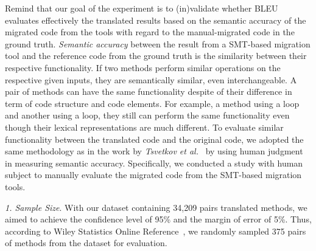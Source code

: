 %
Remind that our goal of the experiment is to (in)validate whether BLEU
evaluates effectively the translated results based on the semantic accuracy 
of the migrated code from the tools with regard to the manual-migrated code 
in the ground truth. 
%
{\em Semantic accuracy} between the result from a SMT-based migration
tool and the reference code from the ground truth is the similarity
between their respective functionality. 
%
If two methods perform similar operations on the respective given
inputs, they are semantically similar, even interchangeable. A pair of
methods can have the same functionality despite of their difference in
term of code structure and code elements.
%
For example, a method using a  loop and another using a
 loop, they still can perform the same functionality even
though their lexical representations are much different. 
%
%
To evaluate similar functionality between the translated code and the
original code, we adopted the same methodology as in the work by {\em
  Tsvetkov et al.}~\cite{tsvetkov-acl15} by using human judgment in
measuring semantic accuracy.
%
%
Specifically, we conducted a study with human subject to manually
evaluate the migrated code from the SMT-based migration tools.


\emph{1. Sample Size}. 
%
With our dataset containing 34,209 pairs translated methods, we aimed
to achieve the confidence level of 95\% and the margin of error of
5\%. Thus, according to Wiley Statistics Online Reference~\cite{geek_2015}, we randomly sampled
375 pairs of methods from the dataset for evaluation.

